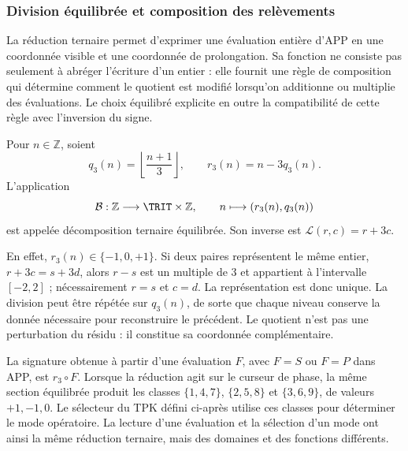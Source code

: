 \subsubsection{Division équilibrée et composition des relèvements}
\label{trit-ampl-div-balanceada}

La réduction ternaire permet d'exprimer une évaluation entière d'APP en une
coordonnée visible et une coordonnée de prolongation. Sa fonction ne consiste
pas seulement à abréger l'écriture d'un entier : elle fournit une règle de
composition qui détermine comment le quotient est modifié lorsqu'on additionne ou
multiplie des évaluations. Le choix équilibré explicite en outre la
compatibilité de cette règle avec l'inversion du signe.

\begin{definition}
\label{trit-ampl-def-coordenadas}
Pour \(n\in\mathbb Z\), soient
\[
 q_3(n)=\left\lfloor\frac{n+1}{3}\right\rfloor,\qquad
 r_3(n)=n-3q_3(n).
\]
L'application
\[
 \mathcal B:\mathbb Z\longrightarrow\TRIT\times\mathbb Z,\qquad
 n\longmapsto(r_3(n),q_3(n))
\]
est appelée décomposition ternaire équilibrée. Son inverse est
\(\mathcal L(r,c)=r+3c\).
\end{definition}

En effet, \(r_3(n)\in\{-1,0,+1\}\). Si deux paires représentent le même entier,
\(r+3c=s+3d\), alors \(r-s\) est un multiple de \(3\) et appartient à l'intervalle
\([-2,2]\) ; nécessairement \(r=s\) et \(c=d\). La représentation est donc
unique. La division peut être répétée sur \(q_3(n)\), de sorte que chaque niveau
conserve la donnée nécessaire pour reconstruire le précédent. Le quotient n'est pas une
perturbation du résidu : il constitue sa coordonnée complémentaire.

La signature obtenue à partir d'une évaluation \(F\), avec \(F=S\) ou \(F=P\) dans APP, est \(r_3\circ F\). Lorsque la réduction agit sur le curseur de phase, la même section équilibrée produit les classes \(\{1,4,7\}\), \(\{2,5,8\}\) et \(\{3,6,9\}\), de valeurs \(+1,-1,0\). Le sélecteur du TPK défini ci-après utilise ces classes pour déterminer le mode opératoire. La lecture d'une évaluation et la sélection d'un mode ont ainsi la même réduction ternaire, mais des domaines et des fonctions différents.

